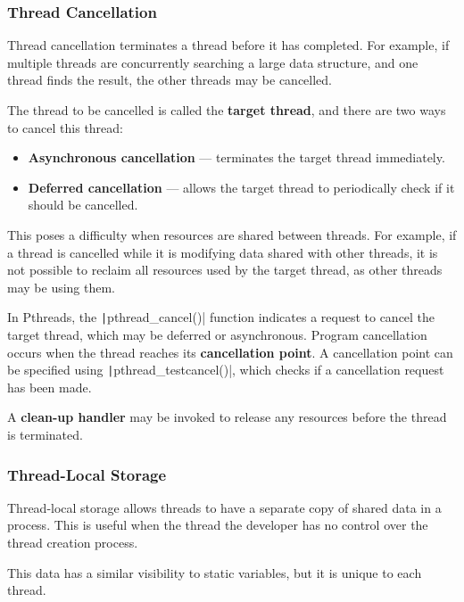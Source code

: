 \documentclass{article}
\begin{document}
\subsubsection{Thread Cancellation}
Thread cancellation terminates a thread before it has completed. For
example, if multiple threads are concurrently searching a large data
structure, and one thread finds the result, the other threads may be
cancelled.

The thread to be cancelled is called the \textbf{target thread}, and
there are two ways to cancel this thread:
\begin{itemize}
    \item \textbf{Asynchronous cancellation} --- terminates the target
          thread immediately.
    \item \textbf{Deferred cancellation} --- allows the target thread
          to periodically check if it should be cancelled.
\end{itemize}
This poses a difficulty when resources are shared between threads.
For example, if a thread is cancelled while it is modifying data shared
with other threads, it is not possible to reclaim all resources used by
the target thread, as other threads may be using them.

In Pthreads, the \texttt|pthread_cancel()| function indicates a
request to cancel the target thread, which may be deferred or
asynchronous. Program cancellation occurs when the thread reaches its
\textbf{cancellation point}. A cancellation point can be specified
using \texttt|pthread_testcancel()|, which checks if a
cancellation request has been made.

A \textbf{clean-up handler} may be invoked to release any resources
before the thread is terminated.
\subsubsection{Thread-Local Storage}
Thread-local storage allows threads to have a separate copy of shared
data in a process. This is useful when the thread the developer has no
control over the thread creation process.

This data has a similar visibility to static variables, but it is
unique to each thread.
\end{document}
